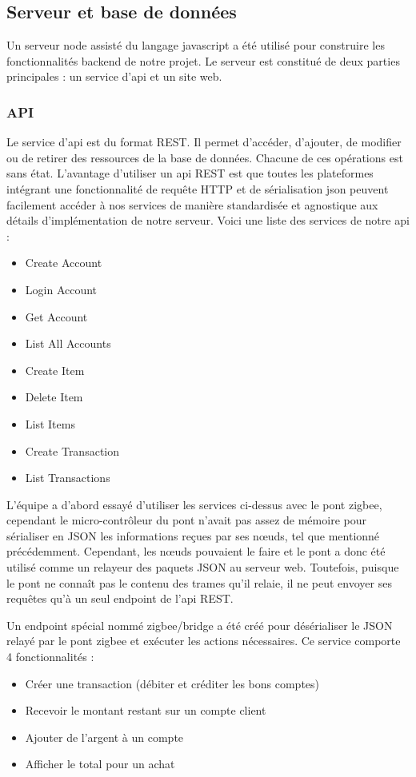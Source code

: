 	\subsection{Serveur et base de données}
		Un serveur \og node \fg{} assisté du langage javascript a été utilisé pour construire les fonctionnalités \og backend \fg{} de notre projet. Le serveur est constitué de deux parties principales : un service d’api et un site web. 
		
		\subsubsection{API}
		Le service d’api est du format REST. Il permet d’accéder, d’ajouter, de modifier ou de retirer des ressources de la base de données. Chacune de ces opérations est sans état. L’avantage d’utiliser un api REST est que toutes les plateformes intégrant une fonctionnalité de requête HTTP et de sérialisation json peuvent facilement accéder à nos services de manière standardisée et agnostique aux détails d’implémentation de notre serveur. Voici une liste des services de notre api : 
		\begin{multicols}{3}
		\begin{itemize}
			\item Create Account
			\item Login Account
			\item Get Account
			\item List All Accounts
			\item Create Item
			\item Delete Item
			\item List Items
			\item Create Transaction
			\item List Transactions
		\end{itemize}
		\end{multicols}

		L’équipe a d’abord essayé d’utiliser les services ci-dessus avec le pont zigbee, cependant le micro-contrôleur du pont n’avait pas assez de mémoire pour sérialiser en JSON les informations reçues par ses n\oe{}uds, tel que mentionné précédemment. Cependant, les n\oe{}uds pouvaient le faire et le pont a donc été utilisé comme un relayeur des paquets JSON au serveur web. Toutefois, puisque le pont ne connaît pas le contenu des trames qu’il relaie, il ne peut envoyer ses requêtes qu’à un seul \og endpoint \fg{} de l’api REST. 

		Un \og endpoint \fg{} spécial nommé \og zigbee/bridge \fg{} a été créé pour désérialiser le JSON relayé par le pont zigbee et exécuter les actions nécessaires. Ce service comporte 4 fonctionnalités : 
		\begin{itemize}
			\item Créer une transaction (débiter et créditer les bons comptes)
			\item Recevoir le montant restant sur un compte client
			\item Ajouter de l’argent à un compte
			\item Afficher le total pour un achat
		\end{itemize}

